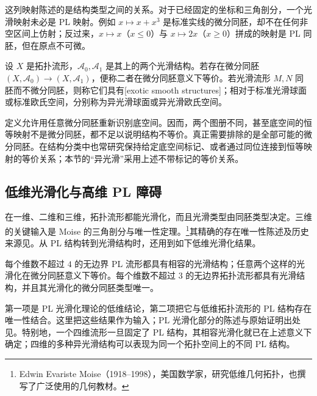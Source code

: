 \ProseParagraphBreak

这列映射陈述的是结构类型之间的关系。对于已经固定的坐标和三角剖分，一个光滑映射未必是 PL 映射。例如 \(x\mapsto x+x^3\) 是标准实线的微分同胚，却不在任何非空区间上仿射；反过来，\(x\mapsto x\)（\(x\le0\)）与 \(x\mapsto2x\)（\(x\ge0\)）拼成的映射是 PL 同胚，但在原点不可微。

\begin{definition}\label{g2:def:inequivalent-smooth-structures}
	设 \(X\) 是拓扑流形，\(\mathcal A_0,\mathcal A_1\) 是其上的两个光滑结构。若存在微分同胚 \((X,\mathcal A_0)\rightarrow(X,\mathcal A_1)\)，便称二者在微分同胚意义下等价。若光滑流形 \(M,N\) 同胚而不微分同胚，则称它们具有[exotic smooth structures]；相对于标准光滑球面或标准欧氏空间，分别称为异光滑球面或异光滑欧氏空间。
\end{definition}

定义允许用任意微分同胚重新识别底空间。因而，两个图册不同，甚至底空间的恒等映射不是微分同胚，都不足以说明结构不等价。真正需要排除的是全部可能的微分同胚。在结构分类中也常研究保持给定底空间标记、或者通过同位连接到恒等映射的等价关系；本节的“异光滑”采用上述不带标记的等价关系。

\subsection{低维光滑化与高维 PL 障碍}
\label{g2:subsec:2304:02}
在一维、二维和三维，拓扑流形都能光滑化，而且光滑类型由同胚类型决定。三维的关键输入是 Moise 的三角剖分与唯一性定理。\footnote{Edwin Evariste Moise（1918--1998），美国数学家，研究低维几何拓扑，也撰写了广泛使用的几何教材。}其精确的存在唯一性陈述及历史来源见\cite[Annex 3，第1节，第308页；Essay V，第5节，第253--254页]{KirbySiebenmann1977}。从 PL 结构转到光滑结构时，还用到如下低维光滑化结果。

\begin{theorem}\label{g2:thm:low-dimensional-smoothing}
	每个维数不超过 \(4\) 的无边界 PL 流形都具有相容的光滑结构；任意两个这样的光滑化在微分同胚意义下等价。每个维数不超过 \(3\) 的无边界拓扑流形都具有光滑结构，并且其光滑化的微分同胚类型唯一。
\end{theorem}

第一项是 PL 光滑化理论的低维结论，第二项把它与低维拓扑流形的 PL 结构存在唯一性结合。这里把这些结果作为输入；PL 光滑化部分的陈述与原始证明出处见\cite[Essay I，第5节，第39页]{KirbySiebenmann1977}。特别地，一个四维流形一旦固定了 PL 结构，其相容光滑化就已在上述意义下确定；四维的多种异光滑结构可以表现为同一个拓扑空间上的不同 PL 结构。

